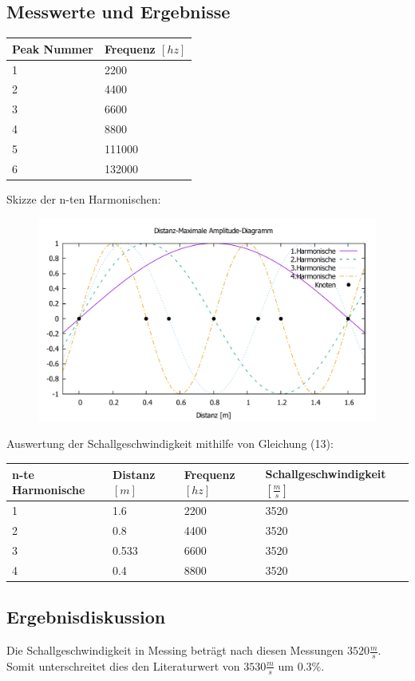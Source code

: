 \documentclass{scrartcl}
\begin{document}
\subsection{Messwerte und Ergebnisse}
\begin{table}[H]
\begin{tabular}{l|l}
Peak Nummer &	Frequenz $[hz]$\\ \hline
1			&	2200\\
2			&	4400\\
3			&	6600\\
4			&	8800\\
5			&	111000\\
6			&	132000\\
\end{tabular}
\end{table}
Skizze der n-ten Harmonischen:
\begin{figure}[H]
  \centering
    \includegraphics[width=1\textwidth]{Versuch4_skizze.pdf}
  
  \label{fig:Diagramm}
\end{figure}
\begin{table}[H]
Auswertung der Schallgeschwindigkeit mithilfe von Gleichung (13):
\begin{tabular}{l|l|l|l}
n-te Harmonische &	Distanz $[m]$ & Frequenz $[hz]$&Schallgeschwindigkeit $[\frac{m}{s}]$\\ \hline
1			&	1.6		&	2200	&	 3520\\
2			&	0.8		&	4400	&	 3520\\
3			&	0.533	& 	6600	&	3520\\
4			&	0.4		& 	8800	&	3520\\

\end{tabular}
\end{table}
\subsection{Ergebnisdiskussion}
Die Schallgeschwindigkeit in Messing beträgt nach diesen Messungen $3520\frac{m}{s}$. Somit unterschreitet dies den Literaturwert von $3530\frac{m}{s}$ um $0.3\%$.
\end{document}
